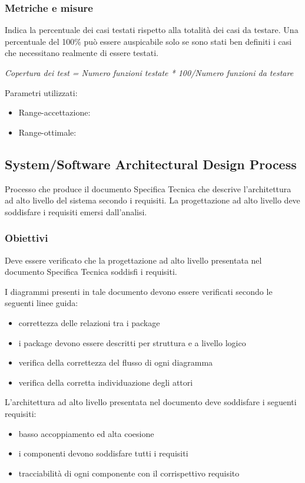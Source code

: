 \documentclass[a4paper,11pt]{article}
\begin{document}
\begin{itemize}
\subsubsection{Metriche e misure}
Indica la percentuale dei casi testati rispetto alla totalità dei casi da testare. Una percentuale del 100\% può essere auspicabile solo se sono stati ben definiti i casi che necessitano realmente di essere testati. 
\begin{center}
\textit{Copertura dei test = Numero funzioni testate * 100/Numero funzioni da testare}
\end{center}
Parametri utilizzati: 
\begin{itemize}
	\item Range-accettazione: \begin{math}[70 - 100]\end{math}
\item Range-ottimale: \begin{math}[80 - 100]\end{math}
	\end{itemize}
	
\subsection{System/Software Architectural Design Process}
Processo che produce il documento Specifica Tecnica che descrive l'architettura ad alto livello del sistema secondo i requisiti. La progettazione ad alto livello deve soddisfare i requisiti emersi dall'analisi. 

\subsubsection{Obiettivi}
Deve essere verificato che la progettazione ad alto livello presentata nel documento Specifica Tecnica soddisfi i requisiti.

I diagrammi presenti in tale documento devono essere verificati secondo le seguenti linee guida: 
\begin{itemize}

\item correttezza delle relazioni tra i package
\item i package devono essere descritti per struttura e a livello logico

\item verifica della correttezza del flusso di ogni diagramma
\item verifica della corretta individuazione degli attori
\end{itemize}
L'architettura ad alto livello presentata nel documento deve soddisfare i seguenti requisiti:
\begin{itemize}
\item basso accoppiamento ed alta coesione
\item i componenti devono soddisfare tutti i requisiti 
\item tracciabilità di ogni componente con il corrispettivo requisito
\end{itemize}

\end{itemize}
\end{document}
